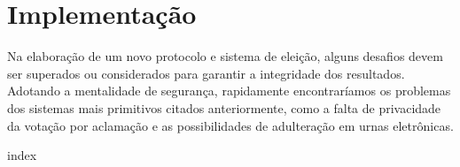 \chapter{Implementação}
\label{ch:implementação}

Na elaboração de um novo protocolo e sistema de eleição, alguns desafios devem ser superados ou considerados para garantir a integridade dos resultados. Adotando a mentalidade de segurança, rapidamente encontraríamos os problemas dos sistemas mais primitivos citados anteriormente, como a falta de privacidade da votação por aclamação e as possibilidades de adulteração em urnas eletrônicas.




{index}



